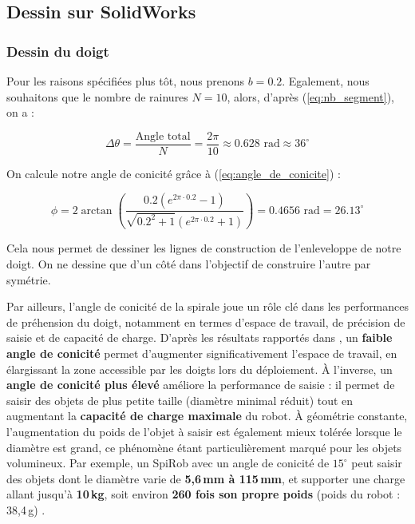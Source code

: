 \documentclass[a4paper, 11pt]{report}
\begin{document}
    \subsection{Dessin sur SolidWorks}

        \subsubsection{Dessin du doigt}

            Pour les raisons spécifiées plus tôt, nous prenons $b = 0.2$. Egalement, nous souhaitons que le nombre de rainures $N = 10$, alors, d'après (\ref{eq:nb_segment}), on a :

            \[
            \Delta\theta= \frac{\text{Angle total}}{N} = \frac{2\pi}{10} \approx 0.628 \text{ rad} \approx 36^{\circ}
            \]
            
            On calcule notre angle de conicité grâce à (\ref{eq:angle_de_conicite}) :
            
            \[
            \phi = 2 \arctan\left( \frac{0.2\left(e^{2\pi \cdot 0.2} - 1\right)}{\sqrt{0.2^2 + 1} \left(e^{2\pi \cdot 0.2} + 1\right)} \right)
            = 0.4656 \text{ rad}
            = 26.13^{\circ}
            \]

            Cela nous permet de dessiner les lignes de construction de l'enleveloppe de notre doigt. On ne dessine que d'un côté dans l'objectif de construire l'autre par symétrie.

            Par ailleurs, l'angle de conicité de la spirale joue un rôle clé dans les performances de préhension du doigt, notamment en termes d’espace de travail, de précision de saisie et de capacité de charge. 
            D’après les résultats rapportés dans \cite{wang_spirobs_2025}, un \textbf{faible angle de conicité} permet d’augmenter significativement l’espace de travail, en élargissant la zone accessible par les doigts lors du déploiement. À l’inverse, un \textbf{angle de conicité plus élevé} améliore la performance de saisie : il permet de saisir des objets de plus petite taille (diamètre minimal réduit) tout en augmentant la \textbf{capacité de charge maximale} du robot.
            À géométrie constante, l’augmentation du poids de l’objet à saisir est également mieux tolérée lorsque le diamètre est grand, ce phénomène étant particulièrement marqué pour les objets volumineux. Par exemple, un SpiRob avec un angle de conicité de $15^\circ$ peut saisir des objets dont le diamètre varie de \textbf{5{,}6\,mm à 115\,mm}, et supporter une charge allant jusqu’à \textbf{10\,kg}, soit environ \textbf{260 fois son propre poids} (poids du robot : 38{,}4\,g) \cite{wang_spirobs_2025}.
\end{document}
